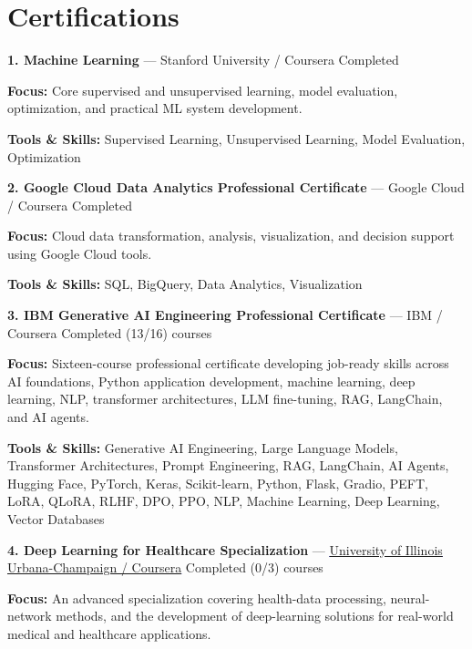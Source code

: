 \documentclass[9pt,letterpaper]{extarticle}
\begin{document}
\section{Certifications}
\noindent\textbf{1. Machine Learning} {\small --- Stanford University / Coursera \textbar{} Completed}\par
\textbf{Focus:} Core supervised and unsupervised learning, model evaluation, optimization, and practical ML system development.\par
{\small\textbf{Tools \& Skills:} Supervised Learning, Unsupervised Learning, Model Evaluation, Optimization\par}
\vspace{2pt}
\noindent\textbf{2. Google Cloud Data Analytics Professional Certificate} {\small --- Google Cloud / Coursera \textbar{} Completed}\par
\textbf{Focus:} Cloud data transformation, analysis, visualization, and decision support using Google Cloud tools.\par
{\small\textbf{Tools \& Skills:} SQL, BigQuery, Data Analytics, Visualization\par}
\vspace{2pt}
\noindent\textbf{3. IBM Generative AI Engineering Professional Certificate} {\small --- IBM / Coursera \textbar{} Completed (13/16) courses}\par
\textbf{Focus:} Sixteen-course professional certificate developing job-ready skills across AI foundations, Python application development, machine learning, deep learning, NLP, transformer architectures, LLM fine-tuning, RAG, LangChain, and AI agents.\par
{\small\textbf{Tools \& Skills:} Generative AI Engineering, Large Language Models, Transformer Architectures, Prompt Engineering, RAG, LangChain, AI Agents, Hugging Face, PyTorch, Keras, Scikit-learn, Python, Flask, Gradio, PEFT, LoRA, QLoRA, RLHF, DPO, PPO, NLP, Machine Learning, Deep Learning, Vector Databases\par}
\vspace{2pt}
\noindent\textbf{4. Deep Learning for Healthcare Specialization} {\small --- \textcolor{blue}{\underline{\href{https://www.coursera.org/specializations/deep-learning-healthcare}{University of Illinois Urbana-Champaign / Coursera}}} \textbar{} Completed (0/3) courses}\par
\textbf{Focus:} An advanced specialization covering health-data processing, neural-network methods, and the development of deep-learning solutions for real-world medical and healthcare applications.\par
\end{document}
